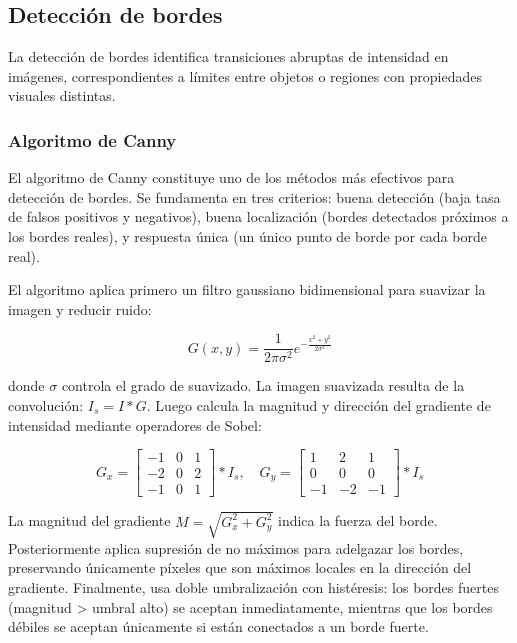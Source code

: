 \subsection{Detección de bordes}

La detección de bordes identifica transiciones abruptas de intensidad en imágenes, correspondientes a límites entre objetos o regiones con propiedades visuales distintas. 

\subsubsection{Algoritmo de Canny}

El algoritmo de Canny constituye uno de los métodos más efectivos para detección de bordes. Se fundamenta en tres criterios: buena detección (baja tasa de falsos positivos y negativos), buena localización (bordes detectados próximos a los bordes reales), y respuesta única (un único punto de borde por cada borde real).

El algoritmo aplica primero un filtro gaussiano bidimensional para suavizar la imagen y reducir ruido:

\begin{equation}
G(x,y) = \frac{1}{2\pi\sigma^2} e^{-\frac{x^2 + y^2}{2\sigma^2}}
\end{equation}

donde $\sigma$ controla el grado de suavizado. La imagen suavizada resulta de la convolución: $I_s = I \ast G$. Luego calcula la magnitud y dirección del gradiente de intensidad mediante operadores de Sobel:

\begin{equation}
G_x = \begin{bmatrix} -1 & 0 & 1 \\ -2 & 0 & 2 \\ -1 & 0 & 1 \end{bmatrix} \ast I_s, \quad G_y = \begin{bmatrix} 1 & 2 & 1 \\ 0 & 0 & 0 \\ -1 & -2 & -1 \end{bmatrix} \ast I_s
\end{equation}

La magnitud del gradiente $M = \sqrt{G_x^2 + G_y^2}$ indica la fuerza del borde. Posteriormente aplica supresión de no máximos para adelgazar los bordes, preservando únicamente píxeles que son máximos locales en la dirección del gradiente. Finalmente, usa doble umbralización con histéresis: los bordes fuertes (magnitud > umbral alto) se aceptan inmediatamente, mientras que los bordes débiles se aceptan únicamente si están conectados a un borde fuerte.
